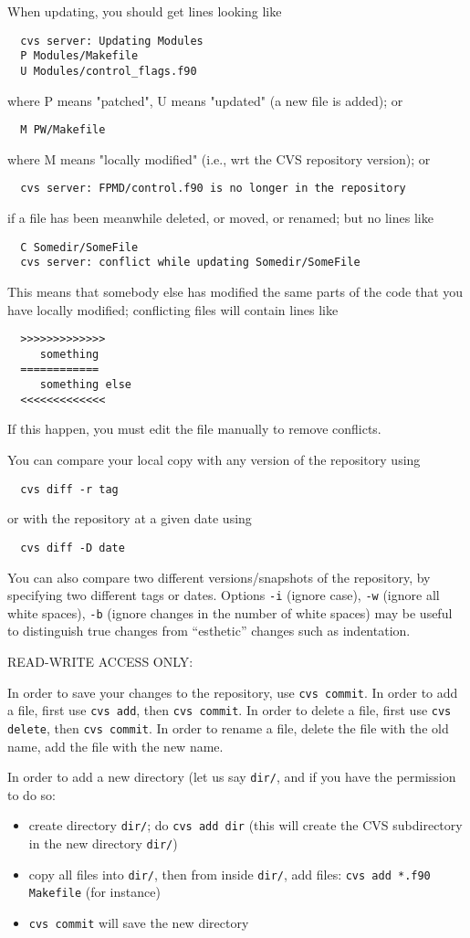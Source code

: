 \documentclass[12pt,a4paper]{article}
\begin{document}
When updating, you should get lines looking like
\begin{verbatim}
  cvs server: Updating Modules
  P Modules/Makefile
  U Modules/control_flags.f90
\end{verbatim}
where P means "patched", U means "updated" (a new file is added); or
\begin{verbatim}
  M PW/Makefile
\end{verbatim}
where M means "locally modified" (i.e., wrt the CVS repository
version); or
\begin{verbatim}
  cvs server: FPMD/control.f90 is no longer in the repository
\end{verbatim}
if a file has been meanwhile deleted, or moved, or renamed; but no lines like
\begin{verbatim}
  C Somedir/SomeFile
  cvs server: conflict while updating Somedir/SomeFile
\end{verbatim}
This means that somebody else has modified the same parts of the code 
that you have locally modified; conflicting files will contain lines like
\begin{verbatim}
  >>>>>>>>>>>>>
     something
  ============
     something else
  <<<<<<<<<<<<<
\end{verbatim}
If this happen, you must edit the file manually to remove conflicts.

You can compare your local copy with any version of the repository
using 
\begin{verbatim}
  cvs diff -r tag
\end{verbatim}
or with the repository at a given date using 
\begin{verbatim}
  cvs diff -D date
\end{verbatim}
You can also compare two different versions/snapshots of the repository, 
by specifying two different tags or dates. Options \texttt{-i} (ignore case),  
\texttt{-w} (ignore all white spaces), \texttt{-b} (ignore changes in 
the number of white spaces) may be useful to distinguish true changes
from ``esthetic'' changes such as indentation.

READ-WRITE ACCESS ONLY:

In order to save your changes to the repository, use
{\tt cvs commit}. In order to add a file, first use
{\tt cvs add}, then {\tt cvs commit}. In order to delete
a file, first use {\tt cvs delete}, then {\tt cvs commit}.
In order to rename a file, delete the file with the old
name, add the file with the new name.

In order to add a new directory (let us say {\tt dir/}, 
and if you have the permission to do so:
\begin{itemize}
\item create directory {\tt dir/}; do {\tt cvs add dir} (this
will create the CVS subdirectory in the new directory {\tt dir/})
\item 
copy all files into {\tt dir/}, then from inside {\tt dir/}, add files:
{\tt cvs add *.f90 Makefile} (for instance)
\item
{\tt cvs commit} will save the new directory
\end{itemize}
\end{document}
